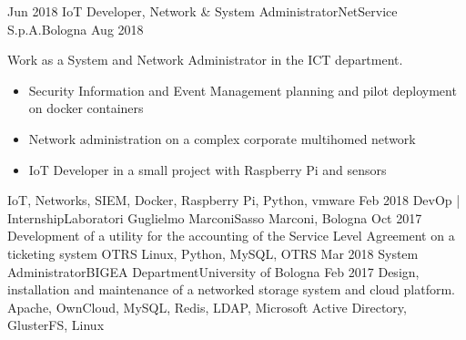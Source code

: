 %
%
%

\begin{experiences}
  \experience
  {Jun 2018} {IoT Developer, Network \& System Administrator}{NetService S.p.A.}{Bologna}
  {Aug 2018}    {
                    Work as a System and Network Administrator in the ICT department.
                    \begin{itemize}
                      \item Security Information and Event Management planning and pilot deployment on docker containers
                      \item Network administration on a complex corporate multihomed network 
                      \item IoT Developer in a small project with Raspberry Pi and sensors
                    \end{itemize}
                  }
                  {IoT, Networks, SIEM, Docker, Raspberry Pi, Python, vmware}
\emptySeparator
  \experience
    {Feb 2018} {DevOp | Internship}{Laboratori Guglielmo Marconi}{Sasso Marconi, Bologna}
    {Oct 2017}    {
                      Development of a utility for the accounting of the Service Level Agreement on a ticketing system OTRS
                    }
                    {Linux, Python, MySQL, OTRS}
  \emptySeparator
  \experience
    {Mar 2018}   {System Administrator}{BIGEA Department}{University of Bologna}
    {Feb 2017} {
                    Design, installation and maintenance of a networked storage system and cloud platform.
                    }
                    {Apache, OwnCloud, MySQL, Redis, LDAP, Microsoft Active Directory, GlusterFS, Linux}
\emptySeparator
\end{experiences}